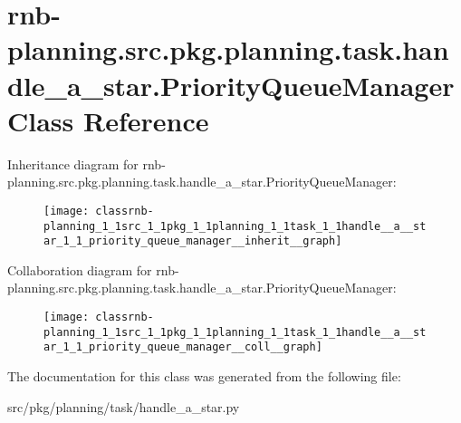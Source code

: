 \hypertarget{classrnb-planning_1_1src_1_1pkg_1_1planning_1_1task_1_1handle__a__star_1_1_priority_queue_manager}{}\section{rnb-\/planning.src.\+pkg.\+planning.\+task.\+handle\+\_\+a\+\_\+star.\+Priority\+Queue\+Manager Class Reference}
\label{classrnb-planning_1_1src_1_1pkg_1_1planning_1_1task_1_1handle__a__star_1_1_priority_queue_manager}


Inheritance diagram for rnb-\/planning.src.\+pkg.\+planning.\+task.\+handle\+\_\+a\+\_\+star.\+Priority\+Queue\+Manager\+:
\nopagebreak
\begin{figure}[H]
\begin{center}
\leavevmode
\texttt{[image: classrnb-planning\_1\_1src\_1\_1pkg\_1\_1planning\_1\_1task\_1\_1handle\_\_a\_\_star\_1\_1\_priority\_queue\_manager\_\_inherit\_\_graph]}
\end{center}
\end{figure}


Collaboration diagram for rnb-\/planning.src.\+pkg.\+planning.\+task.\+handle\+\_\+a\+\_\+star.\+Priority\+Queue\+Manager\+:
\nopagebreak
\begin{figure}[H]
\begin{center}
\leavevmode
\texttt{[image: classrnb-planning\_1\_1src\_1\_1pkg\_1\_1planning\_1\_1task\_1\_1handle\_\_a\_\_star\_1\_1\_priority\_queue\_manager\_\_coll\_\_graph]}
\end{center}
\end{figure}


The documentation for this class was generated from the following file\+:\begin{DoxyCompactItemize}
\item 
src/pkg/planning/task/handle\+\_\+a\+\_\+star.\+py\end{DoxyCompactItemize}
